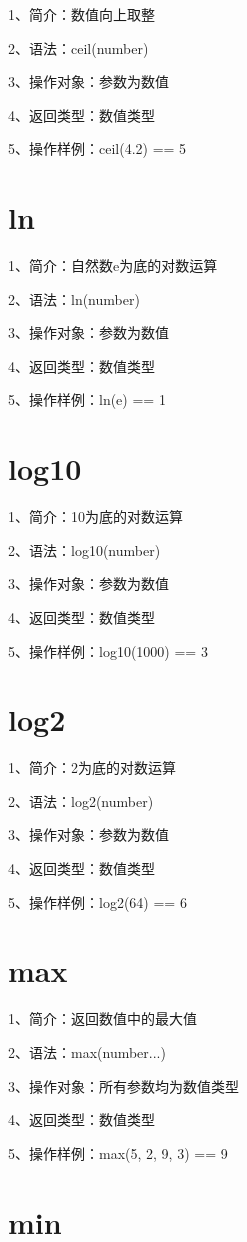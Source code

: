 1、简介：数值向上取整

2、语法：ceil(number)

3、操作对象：参数为数值

4、返回类型：数值类型

5、操作样例：ceil(4.2) == 5

\section{ln}

1、简介：自然数e为底的对数运算

2、语法：ln(number)

3、操作对象：参数为数值

4、返回类型：数值类型

5、操作样例：ln(e) == 1

\section{log10}

1、简介：10为底的对数运算

2、语法：log10(number)

3、操作对象：参数为数值

4、返回类型：数值类型

5、操作样例：log10(1000) == 3

\section{log2}

1、简介：2为底的对数运算

2、语法：log2(number)

3、操作对象：参数为数值

4、返回类型：数值类型

5、操作样例：log2(64) == 6

\section{max}

1、简介：返回数值中的最大值

2、语法：max(number...)

3、操作对象：所有参数均为数值类型

4、返回类型：数值类型

5、操作样例：max(5, 2, 9, 3) == 9

\section{min}

